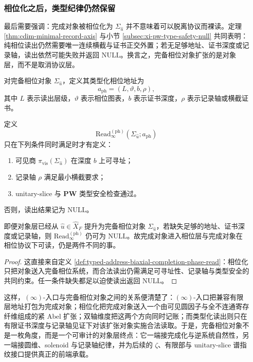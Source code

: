 \subsubsection{相位化之后，类型纪律仍然保留}\label{subsubsec:typed-address-biaxial-completion-phase-readability}
最后需要强调：完成对象被相位化为 \(\Sigma_{\hat u}\) 并不意味着可以脱离协议而裸读。定理 \ref{thm:cdim-minimal-record-axis} 与小节 \ref{subsec:xi-pw-type-safety-null} 共同表明：纯相位读出仍然需要唯一连续横截与证书正交外置；若无足够地址、证书深度或记录轴，读出依然可能失败并返回 \(\mathrm{NULL}\)。换言之，完备相位对象扩张的是对象层，而不是取消协议层。

\begin{definition}[类型化相位地址]\label{def:typed-address-biaxial-completion-phase-address}
对完备相位对象 \(\Sigma_{\hat u}\)，定义其类型化相位地址为
\[
a_{\mathrm{ph}}=(L,\vartheta,b,\rho),
\]
其中 \(L\) 表示读出层级，\(\vartheta\) 表示相位图表，\(b\) 表示证书深度，\(\rho\) 表示记录轴或横截证书。
\end{definition}

\begin{definition}[完备相位对象的合法读出]\label{def:typed-address-biaxial-completion-phase-read}
定义
\[
\mathrm{Read}^{(\mathrm{ph})}_{\infty}(\Sigma_{\hat u};a_{\mathrm{ph}})
\]
只在下列条件同时满足时才有定义：
\begin{enumerate}
  \item 可见商 \(\pi_{\mathrm{vis}}(\Sigma_{\hat u})\) 在深度 \(b\) 上可寻址；
  \item 记录轴 \(\rho\) 满足最小横截要求；
  \item unitary-slice 与 \(\mathbf{PW}\) 类型安全检查通过。
\end{enumerate}
否则，读出结果记为 \(\mathrm{NULL}\)。
\end{definition}

\begin{proposition}\label{prop:typed-address-biaxial-completion-phase-null}
即便对象层已经从 \(\hat u\in\widehat X_F\) 提升为完备相位对象 \(\Sigma_{\hat u}\)，若缺失足够的地址、证书深度或记录轴，则 \(\mathrm{Read}^{(\mathrm{ph})}_{\infty}\) 仍可为 \(\mathrm{NULL}\)。故完成对象进入相位层与完成对象在相位协议下可读，仍是两件不同的事。
\end{proposition}
\begin{proof}
这直接来自定义 \ref{def:typed-address-biaxial-completion-phase-read}：相位化只把对象送入完备相位系统，而合法读出仍需满足可寻址性、记录轴与类型安全的共同约束。任一条件缺失都足以迫使读出返回 \(\mathrm{NULL}\)。
\end{proof}

这样，\((\infty)\)-入口与完备相位对象之间的关系便清楚了：\((\infty)\)-入口把兼容有限层地址打包为完成对象；相位化把完成对象送入一个由可见圆因子与全不连通寄存纤维组成的紧 Abel 扩张；双轴维度把这两个方向同时记账；而类型化读出则只在有限证书深度与记录轴见证下对该扩张对象实施合法读取。于是，完备相位对象不是一枚角度，而是一个可审计的对象层终点：它一端接完成化与逆系统自然性，另一端接圆维、solenoid 与记录轴纪律，并为后续的 \(\zeta\)、有限部与 unitary-slice 谱指纹接口提供真正的前端承载。
